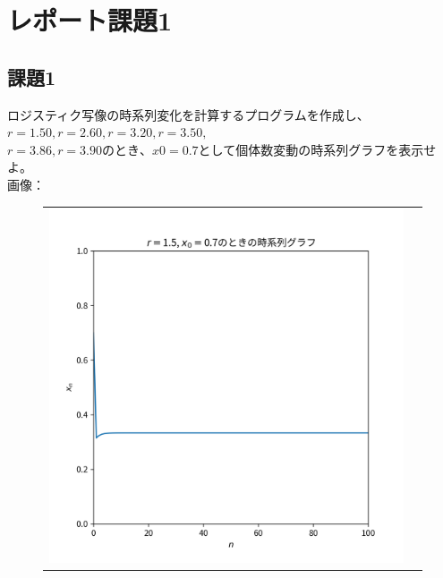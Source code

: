 \section{レポート課題1}
\subsection{課題1}
ロジスティク写像の時系列変化を計算するプログラムを作成し、$r = 1.50, r = 2.60,r = 3.20, r = 3.50,$ \\
$r = 3.86, r = 3.90 のとき、x0 = 0.7$として個体数変動の時系列グラフを表示せよ。\\
画像：\\
\begin{figure}[htbp]
  \begin{tabular}{cc}
    \begin{minipage}[t]{0.45\hsize}
      \centering
      \includegraphics[keepaspectratio, scale=0.3]{images/Problem1/ctest2_1_1.png}
    \end{minipage} &
    \begin{minipage}[t]{0.45\hsize}
      \centering

\end{minipage}
\end{tabular}
\end{figure}
